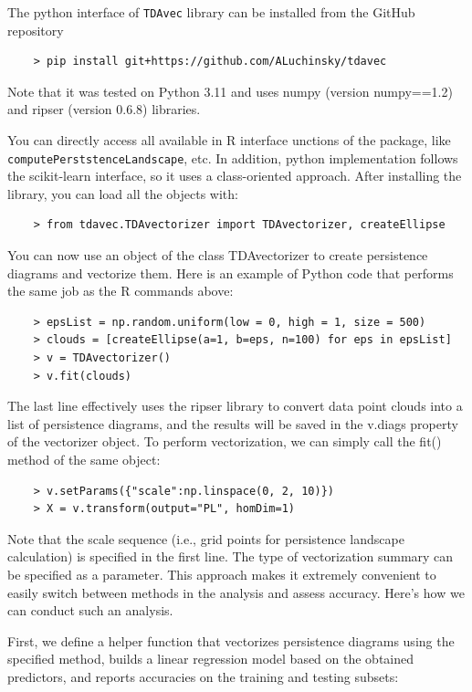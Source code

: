 \documentclass[conference, onecolumn]{IEEEtran}
\begin{document}
The python interface of \texttt{TDAvec} library can be installed from the GitHub repository

\begin{verbatim}
    > pip install git+https://github.com/ALuchinsky/tdavec
\end{verbatim}
Note that it was tested on Python 3.11 and uses numpy (version numpy==1.2) and ripser (version 0.6.8) libraries.

You can directly access all available in R interface unctions of the package, like \texttt{computePerststenceLandscape}, etc. In addition, python implementation follows the scikit-learn interface, so it uses a class-oriented approach. After installing the library, you can load all the objects with:

\begin{verbatim}
    > from tdavec.TDAvectorizer import TDAvectorizer, createEllipse
\end{verbatim}
You can now use an object of the class TDAvectorizer to create persistence diagrams and vectorize them. Here is an example of Python code that performs the same job as the R commands above:

\begin{verbatim}
    > epsList = np.random.uniform(low = 0, high = 1, size = 500)
    > clouds = [createEllipse(a=1, b=eps, n=100) for eps in epsList]
    > v = TDAvectorizer()
    > v.fit(clouds)
\end{verbatim}
The last line effectively uses the ripser library to convert data point clouds into a list of persistence diagrams, and the results will be saved in the v.diags property of the vectorizer object. To perform vectorization, we can simply call the fit() method of the same object:


\begin{verbatim}
    > v.setParams({"scale":np.linspace(0, 2, 10)})
    > X = v.transform(output="PL", homDim=1)
\end{verbatim}
Note that the scale sequence (i.e., grid points for persistence landscape calculation) is specified in the first line. The type of vectorization summary can be specified as a parameter. This approach makes it extremely convenient to easily switch between methods in the analysis and assess accuracy. Here's how we can conduct such an analysis.

First, we define a helper function that vectorizes persistence diagrams using the specified method, builds a linear regression model based on the obtained predictors, and reports accuracies on the training and testing subsets:
\end{document}
